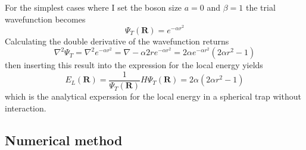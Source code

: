 \documentclass[12pt]{article}
\begin{document}
  For the simplest cases where I set the boson size $a = 0$ and $\beta = 1$ the 
  trial wavefunction becomes 
  \begin{equation}
    \Psi_T(\bm{R}) = e^{-\alpha r^2}
    \label{eq:psi1}
  \end{equation}
  Calculating the double derivative of the wavefunction returns
  \begin{equation}
    \nabla^2\Psi_T = \nabla^2 e^{-\alpha r^2} = \nabla -\alpha 2r e^{-\alpha r^2}%
    = 2\alpha e^{-\alpha r^2}(2\alpha r^2-1)
  \end{equation}
  then inserting this result into the expression for the local energy yields
  \begin{equation}
    E_L(\bm{R}) = \frac{1}{\Psi_T(\bm{R})}H\Psi_T(\bm{R}) = 2\alpha(2\alpha r^2-1)
  \end{equation}
  which is the analytical experssion for the local energy in a spherical trap 
  without interaction.

  \subsection{Numerical method}
\end{document}
